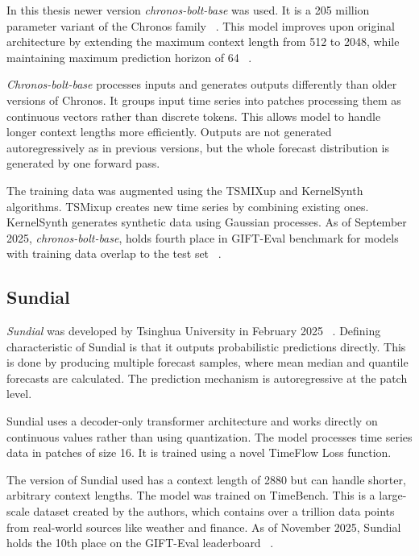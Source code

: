 In this thesis newer version \emph{chronos-bolt-base} was used. It is a 205 million parameter variant of the Chronos family ~\cite{amazon_chronos_bolt_base}.
This model improves upon original architecture by extending the maximum context length from 512 to 2048, while maintaining maximum prediction horizon of 64 ~\cite{ansari2025chronos2}.

\emph{Chronos-bolt-base} processes inputs and generates outputs differently than older versions of Chronos.
It groups input time series into patches processing them as continuous vectors rather than discrete tokens.
This allows model to handle longer context lengths more efficiently.
Outputs are not generated autoregressively as in previous versions, but the whole forecast distribution is generated by one forward pass. ~\cite{ansari_chronos_2024}

The training data was augmented using the TSMIXup and KernelSynth algorithms.
TSMixup creates new time series by combining existing ones. KernelSynth generates synthetic data using Gaussian processes.
As of September 2025, \emph{chronos-bolt-base}, holds fourth place in GIFT-Eval benchmark for models with training data overlap to the test set ~\cite{GIFT-Eval_Leaderboard}.

\subsection{Sundial}

\emph{Sundial} was developed by Tsinghua University in February 2025 ~\cite{liu_sundial_2025}.
Defining characteristic of Sundial is that it outputs probabilistic predictions directly. This is done by producing multiple forecast samples, where mean median and quantile forecasts are calculated.
The prediction mechanism is autoregressive at the patch level.

Sundial uses a decoder-only transformer architecture and works directly on continuous values rather than using quantization.
The model processes time series data in patches of size 16. It is trained using a novel TimeFlow Loss function.

The version of Sundial used has a context length of 2880 but can handle shorter, arbitrary context lengths.
The model was trained on TimeBench. This is a large-scale dataset created by the authors, which contains over a trillion data points from real-world sources like weather and finance.
As of November 2025, Sundial holds the 10th place on the GIFT-Eval leaderboard ~\cite{GIFT-Eval_Leaderboard}.

